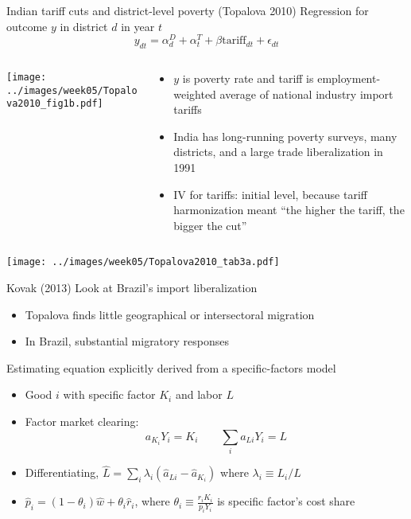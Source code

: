 \documentclass[11pt,notes=hide,aspectratio=169]{beamer}
\begin{document}
\begin{frame}{Indian tariff cuts and district-level poverty (Topalova 2010)}
Regression for outcome $y$ in district $d$ in year $t$
\begin{equation*}
	y_{dt} = \alpha_d^D + \alpha_t^T + \beta \text{tariff}_{dt} + \epsilon_{dt}
\end{equation*}
\vspace{-3mm}
\begin{columns}
\begin{column}{.4\textwidth}
\texttt{[image: ../images/week05/Topalova2010\_fig1b.pdf]}
\end{column}
\begin{column}{.58\textwidth}
\begin{itemize}
	\item $y$ is poverty rate and tariff is employment-weighted average of national industry import tariffs
	\item India has long-running poverty surveys, many districts, and a large trade liberalization in 1991
	\item IV for tariffs: initial level, because tariff harmonization meant ``the higher the tariff, the bigger the cut''
\end{itemize}
\end{column}
\end{columns}
\end{frame}
\begin{frame}{}
\begin{center}
\texttt{[image: ../images/week05/Topalova2010\_tab3a.pdf]}
\end{center}
\end{frame}
\begin{frame}{Kovak (2013)}
Look at Brazil's import liberalization
\begin{itemize}
	\item Topalova finds little geographical or intersectoral migration
	\item In Brazil, substantial migratory responses
\end{itemize}
Estimating equation explicitly derived from a specific-factors model
\begin{itemize}
	\item Good $i$ with specific factor $K_i$ and labor $L$
	\item Factor market clearing:
	\begin{equation*}
	a_{K_i} Y_i = K_i \qquad \sum_{i} a_{Li} Y_i = L
	\end{equation*}
	\item Differentiating, $\hat{L} = \sum_i \lambda_i (\hat{a}_{Li} - \hat{a}_{K_i})$ where $\lambda_i \equiv L_i / L$
	\item $\hat{p}_i = (1-\theta_i)\hat{w} + \theta_i \hat{r}_i$, where $\theta_i \equiv \frac{r_iK_i}{p_i Y_i}$ is specific factor's cost share
\end{itemize}
\end{frame}
\end{document}
